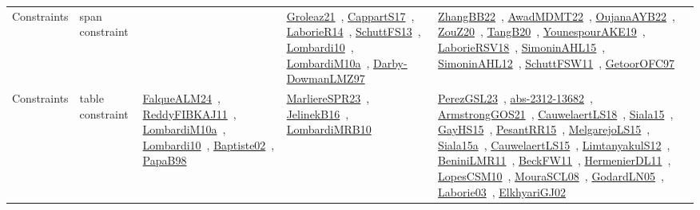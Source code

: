 {\begin{longtable}{lp{3cm}>{\raggedright\arraybackslash}p{6cm}>{\raggedright\arraybackslash}p{6cm}>{\raggedright\arraybackslash}p{8cm}}
Constraints & span constraint &  & \href{../works/Groleaz21.pdf}{Groleaz21}~\cite{Groleaz21}, \href{../works/CappartS17.pdf}{CappartS17}~\cite{CappartS17}, \href{../works/LaborieR14.pdf}{LaborieR14}~\cite{LaborieR14}, \href{../works/SchuttFS13.pdf}{SchuttFS13}~\cite{SchuttFS13}, \href{../works/Lombardi10.pdf}{Lombardi10}~\cite{Lombardi10}, \href{../works/LombardiM10a.pdf}{LombardiM10a}~\cite{LombardiM10a}, \href{../works/Darby-DowmanLMZ97.pdf}{Darby-DowmanLMZ97}~\cite{Darby-DowmanLMZ97} & \href{../works/ZhangBB22.pdf}{ZhangBB22}~\cite{ZhangBB22}, \href{../works/AwadMDMT22.pdf}{AwadMDMT22}~\cite{AwadMDMT22}, \href{../works/OujanaAYB22.pdf}{OujanaAYB22}~\cite{OujanaAYB22}, \href{../works/ZouZ20.pdf}{ZouZ20}~\cite{ZouZ20}, \href{../works/TangB20.pdf}{TangB20}~\cite{TangB20}, \href{../works/YounespourAKE19.pdf}{YounespourAKE19}~\cite{YounespourAKE19}, \href{../works/LaborieRSV18.pdf}{LaborieRSV18}~\cite{LaborieRSV18}, \href{../works/SimoninAHL15.pdf}{SimoninAHL15}~\cite{SimoninAHL15}, \href{../works/SimoninAHL12.pdf}{SimoninAHL12}~\cite{SimoninAHL12}, \href{../works/SchuttFSW11.pdf}{SchuttFSW11}~\cite{SchuttFSW11}, \href{../works/GetoorOFC97.pdf}{GetoorOFC97}~\cite{GetoorOFC97}\\
Constraints & table constraint & \href{../works/FalqueALM24.pdf}{FalqueALM24}~\cite{FalqueALM24}, \href{../works/ReddyFIBKAJ11.pdf}{ReddyFIBKAJ11}~\cite{ReddyFIBKAJ11}, \href{../works/LombardiM10a.pdf}{LombardiM10a}~\cite{LombardiM10a}, \href{../works/Lombardi10.pdf}{Lombardi10}~\cite{Lombardi10}, \href{../works/Baptiste02.pdf}{Baptiste02}~\cite{Baptiste02}, \href{../works/PapaB98.pdf}{PapaB98}~\cite{PapaB98} & \href{../works/MarliereSPR23.pdf}{MarliereSPR23}~\cite{MarliereSPR23}, \href{../works/JelinekB16.pdf}{JelinekB16}~\cite{JelinekB16}, \href{../works/LombardiMRB10.pdf}{LombardiMRB10}~\cite{LombardiMRB10} & \href{../works/PerezGSL23.pdf}{PerezGSL23}~\cite{PerezGSL23}, \href{../works/abs-2312-13682.pdf}{abs-2312-13682}~\cite{abs-2312-13682}, \href{../works/ArmstrongGOS21.pdf}{ArmstrongGOS21}~\cite{ArmstrongGOS21}, \href{../works/CauwelaertLS18.pdf}{CauwelaertLS18}~\cite{CauwelaertLS18}, \href{../works/Siala15.pdf}{Siala15}~\cite{Siala15}, \href{../works/GayHS15.pdf}{GayHS15}~\cite{GayHS15}, \href{../works/PesantRR15.pdf}{PesantRR15}~\cite{PesantRR15}, \href{../works/MelgarejoLS15.pdf}{MelgarejoLS15}~\cite{MelgarejoLS15}, \href{../works/Siala15a.pdf}{Siala15a}~\cite{Siala15a}, \href{../works/CauwelaertLS15.pdf}{CauwelaertLS15}~\cite{CauwelaertLS15}, \href{../works/LimtanyakulS12.pdf}{LimtanyakulS12}~\cite{LimtanyakulS12}, \href{../works/BeniniLMR11.pdf}{BeniniLMR11}~\cite{BeniniLMR11}, \href{../works/BeckFW11.pdf}{BeckFW11}~\cite{BeckFW11}, \href{../works/HermenierDL11.pdf}{HermenierDL11}~\cite{HermenierDL11}, \href{../works/LopesCSM10.pdf}{LopesCSM10}~\cite{LopesCSM10}, \href{../works/MouraSCL08.pdf}{MouraSCL08}~\cite{MouraSCL08}, \href{../works/GodardLN05.pdf}{GodardLN05}~\cite{GodardLN05}, \href{../works/Laborie03.pdf}{Laborie03}~\cite{Laborie03}, \href{../works/ElkhyariGJ02.pdf}{ElkhyariGJ02}~\cite{ElkhyariGJ02}\\
\end{longtable}
}

